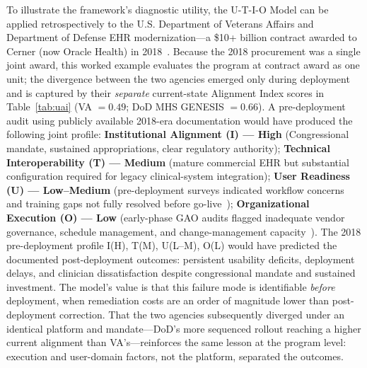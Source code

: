 To illustrate the framework's diagnostic utility, the U-T-I-O Model can be applied retrospectively to the U.S. Department of Veterans Affairs and Department of Defense EHR modernization—a \$10+ billion contract awarded to Cerner (now Oracle Health) in 2018~\cite{gao2025vaehr,gao2024dodehr}. Because the 2018 procurement was a single joint award, this worked example evaluates the program at contract award as one unit; the divergence between the two agencies emerged only during deployment and is captured by their \textit{separate} current-state Alignment Index scores in Table~\ref{tab:uai} (VA $=0.49$; DoD MHS GENESIS $=0.66$). A pre-deployment audit using publicly available 2018-era documentation would have produced the following joint profile: \textbf{Institutional Alignment (I) — High} (Congressional mandate, sustained appropriations, clear regulatory authority); \textbf{Technical Interoperability (T) — Medium} (mature commercial EHR but substantial configuration required for legacy clinical-system integration); \textbf{User Readiness (U) — Low--Medium} (pre-deployment surveys indicated workflow concerns and training gaps not fully resolved before go-live~\cite{gao2025vaehr}); \textbf{Organizational Execution (O) — Low} (early-phase GAO audits flagged inadequate vendor governance, schedule management, and change-management capacity~\cite{gao2024dodehr}). The 2018 pre-deployment profile I(H), T(M), U(L--M), O(L) would have predicted the documented post-deployment outcomes: persistent usability deficits, deployment delays, and clinician dissatisfaction despite congressional mandate and sustained investment. The model's value is that this failure mode is identifiable \textit{before} deployment, when remediation costs are an order of magnitude lower than post-deployment correction. That the two agencies subsequently diverged under an identical platform and mandate—DoD's more sequenced rollout reaching a higher current alignment than VA's—reinforces the same lesson at the program level: execution and user-domain factors, not the platform, separated the outcomes.

